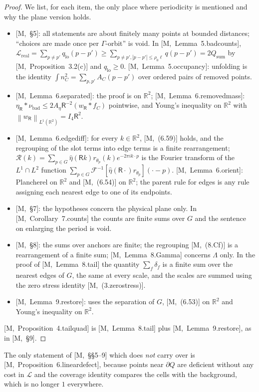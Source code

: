 \documentclass[11pt,reqno]{amsart}
\numberwithin{equation}{section}
\theoremstyle{plain}
\theoremstyle{definition}
\newcommand{\R}{\mathbb{R}}
\newcommand{\Lam}{\Lambda}
\newcommand{\lat}{\ell}
\newcommand{\lo}{\mathrm{lo}}
\newcommand{\bad}{\mathrm{bad}}
\newcommand{\norm}[1]{\left\|#1\right\|}
\newcommand{\cL}{\mathcal{L}}
\newcommand{\fR}{\mathsf{R}}
\newcommand{\ms}[1]{\textup{[M,~#1]}}
\begin{document}
\begin{proof}
We list, for each item, the only place where periodicity is mentioned and why the plane version holds.
\begin{itemize}
\item \ms{\S5}: all statements are about finitely many points at bounded distances; ``choices are made once per $\Gamma$-orbit'' is void.  In \ms{Lemma~5.badcounts}, $\cL_{\mathrm{real}}=\sum_{p\ne p'}q_\lo(p-p')\ge\sum_{p\ne p',|p-p'|\le\rho_0\lat}q(p-p')=2Q_{\mathrm{sum}}$ by \ms{Proposition~3.2(c)} and $q_\lo\ge0$.  \ms{Lemma~5.occupancy}: unfolding is the identity $\int n_C^2=\sum_{p,p'}A_C(p-p')$ over ordered pairs of removed points.
\item \ms{Lemma~6.separated}: the proof is on $\R^2$; \ms{Lemma~6.removedmass}: $\eta_\fR*\nu_\bad\le2A_\eta\fR^{-2}(w_\fR*f_C)$ pointwise, and Young's inequality on $\R^2$ with $\norm{w_\fR}_{L^1(\R^2)}=I_4\fR^2$.
\item \ms{Lemma~6.edgediff}: for every $k\in\R^2$, \ms{(6.59)} holds, and the regrouping of the slot terms into edge terms is a finite rearrangement; $\mathcal R(k)=\sum_{p\in G}\widehat\eta(\fR k)r_{\theta_p}(k)e^{-2\pi ik\cdot p}$ is the Fourier transform of the $L^1\cap L^2$ function $\sum_{p\in G}\mathcal F^{-1}[\widehat\eta(\fR\cdot)r_{\theta_p}](\cdot-p)$.  \ms{Lemma~6.orient}: Plancherel on $\R^2$ and \ms{(6.54)} on $\R^2$; the parent rule for edges is any rule assigning each nearest edge to one of its endpoints.
\item \ms{\S7}: the hypotheses concern the physical plane only.  In \ms{Corollary~7.counts} the counts are finite sums over $G$ and the sentence on enlarging the period is void.
\item \ms{\S8}: the sums over anchors are finite; the regrouping \ms{(8.Cf)} is a rearrangement of a finite sum; \ms{Lemma~8.Gamma} concerns $\Lam$ only.  In the proof of \ms{Lemma~8.tail} the quantity $\sum_f\delta_f$ is a finite sum over the nearest edges of $G$, the same at every scale, and the scales are summed using the zero stress identity \ms{(3.zerostress)}.
\item \ms{Lemma~9.restore}: uses the separation of $G$, \ms{(6.53)} on $\R^2$ and Young's inequality on $\R^2$.
\end{itemize}
\ms{Proposition~4.tailquad} is \ms{Lemma~8.tail} plus \ms{Lemma~9.restore}, as in \ms{\S9}.
\end{proof}

The only statement of \ms{\S\S5--9} which does \emph{not} carry over is \ms{Proposition~6.lineardefect}, because points near $\partial Q$ are deficient without any cost in $\cL$ and the coverage identity compares the cells with the background, which is no longer $1$ everywhere.
\end{document}
